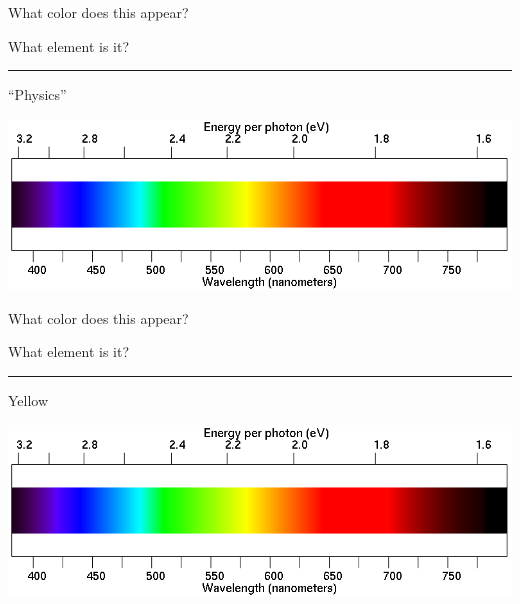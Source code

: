 \documentclass[12pt]{article}
\begin{document}
\begin{minipage}{0.5\textwidth}
What color does this appear?
\end{minipage}
\begin{minipage}{0.5\textwidth}
What element is it?
\end{minipage}


\vspace{0.7in}
\hrule

\begin{minipage}{0.1\textwidth}
\begin{center}
\large ``Physics''
\end{center}
\end{minipage}
\begin{minipage}{0.8\textwidth}
\includegraphics[width=\textwidth]{spectrum2.png}
\end{minipage}

\begin{minipage}{0.5\textwidth}
What color does this appear?
\end{minipage}
\begin{minipage}{0.5\textwidth}
What element is it?
\end{minipage}

\vspace{0.7in}
\hrule

\newpage

 \begin{minipage}{0.1\textwidth}
\begin{center}
\large Yellow
\end{center}
\end{minipage}
\begin{minipage}{0.8\textwidth}
\includegraphics[width=\textwidth]{spectrum2.png}
\end{minipage}
\end{document}
